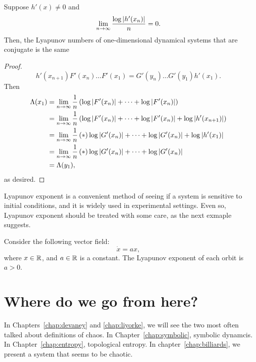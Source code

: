 \documentclass[12pt,twoside,draft]{book}
\begin{document}
\begin{proposition}
  Suppose $h'(x) \neq 0$ and
  \begin{equation*}
    \lim\limits_{n\to \infty} \frac{\log\left | h'(x_n) \right |}{n} = 0.
  \end{equation*}
  Then, the Lyapunov numbers of one-dimensional dynamical systems that are conjugate is the same 
  \label{prop:lyap-conj}
  \begin{proof}
    \begin{equation*}
      h'(x_{n+1})F'(x_n)\ldots F'(x_1) = G'(y_n)\ldots G'(y_1)h'(x_1).
    \end{equation*}
    Then 
    \begin{align*}
      \Lambda(x_1) &= \lim\limits_{n\to \infty} \frac{1}{n}\left ( \log\left | F'(x_n) \right | + \cdots + \log\left | F'(x_n) \right |  \right ) \\
      &= \lim\limits_{n\to \infty} \frac{1}{n}\left(\log\left | F'(x_n) \right | + \cdots + \log\left | F'(x_n) \right | + \log\left | h'(x_{n+1}) \right |\right) \\
      &= \lim\limits_{n\to \infty} \frac{1}{n} \left ( * \right ){ \log\left | G'(x_n) \right | + \cdots + \log\left | G'(x_n) \right | + \log\left | h'(x_1) \right | } \\
      &= \lim\limits_{n\to \infty} \frac{1}{n} \left ( * \right ){ \log\left | G'(x_n) \right | + \cdots + \log\left | G'(x_n) \right | } \\
      &= \Lambda(y_1),
    \end{align*} 
    as desired.
  \end{proof}
\end{proposition}
Lyapunov exponent is a convenient method of seeing if a system is sensitive to initial conditions, and it is widely used in experimental settings.
Even so, Lyapunov exponent should be treated with some care, as the next exmaple suggests.
\begin{example}
  \citep{wiggins}
  Consider the following vector field:
  \begin{equation*}
    \dot{x} = ax,
  \end{equation*}
  where $x \in \mathbb{R}$, and $a \in \mathbb{R}$ is a constant.
  The Lyapunov exponent of each orbit is $a > 0$.
\end{example}
%

\section{Where do we go from here?}
In Chapters~\ref{chap:devaney} and \ref{chap:liyorke}, we will see the two most often talked about definitions of chaos.
In Chapter~\ref{chap:symbolic}, symbolic dynamcis.
In Chapter~\ref{chap:entropy}, topological entropy.
In chapter~\ref{chap:billiards}, we present a system that seems to be chaotic.
\end{document}

